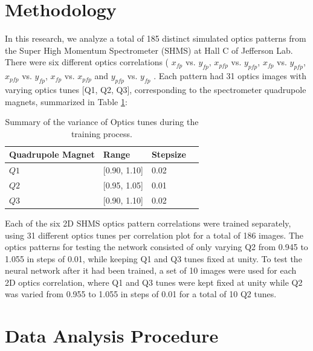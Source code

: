\documentclass[conference]{IEEEtran}
\begin{document}
\section{Methodology}
In this research, we analyze a total of 185 distinct simulated optics patterns from the Super High Momentum Spectrometer (SHMS) at Hall C of Jefferson Lab.
There were six different optics correlations ( $x_{fp}$ vs. $y_{fp}$,  $x_{pfp}$ vs. $y_{pfp}$, $x_{fp}$ vs. $y_{pfp}$,  $x_{pfp}$ vs. $y_{fp}$, $x_{fp}$ vs. $x_{pfp}$ and  $y_{pfp}$ vs. $y_{fp}$ . Each pattern had 31 optics images with varying optics tunes [Q1, Q2, Q3], corresponding to the spectrometer quadrupole magnets, summarized in Table \ref{tab:tune_stpSize}:

\begin{table}[hbt!]
	\begin{center}
		\begin{tabular}{llll} %
                  \hline
                  Quadrupole Magnet & Range & Stepsize \\
                  \hline\hline
	          $Q1$ & [0.90, 1.10] & 0.02  \\
                  $Q2$ & [0.95, 1.05] & 0.01  \\
                  $Q3$ & [0.90, 1.10] & 0.02  \\                       
                  \hline 
		\end{tabular}
	\end{center}
	\caption{Summary of the variance of Optics tunes during the training process.}
	\label{tab:tune_stpSize}
\end{table}

Each of the six 2D SHMS optics pattern correlations were trained separately, using 31 different optics tunes
per correlation plot for a total of 186 images. The optics patterns for testing the network consisted of only
varying Q2 from 0.945 to 1.055 in steps of 0.01, while keeping Q1 and Q3 tunes fixed at unity.
To test the neural network after it had been trained, a set of 10 images were used for each 2D optics correlation, where Q1 and Q3
tunes were kept fixed at unity while Q2 was varied from 0.955 to 1.055 in steps of 0.01 for a total of 10 Q2 tunes.\\



\section{Data Analysis Procedure}
\end{document}
